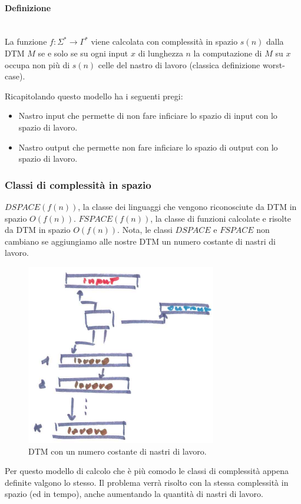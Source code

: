 \documentclass{article}
\begin{document}
\paragraph{Definizione}\mbox{}\\
La funzione $f:\Sigma^*\rightarrow\Gamma^*$ viene calcolata con complessità in spazio $s(n)$
dalla DTM $M$ se e solo se su ogni input $x$ di lunghezza $n$ la computazione di $M$ su $x$ occupa
non più di $s(n)$ celle del nastro di lavoro (classica definizione worst-case).

Ricapitolando questo modello ha i seguenti pregi:
\begin{itemize}
    \item Nastro input che permette di non fare inficiare lo spazio di input con lo spazio di lavoro.
    \item Nastro output che permette non fare inficiare lo spazio di output con lo spazio di lavoro.
\end{itemize}

\subsubsection{Classi di complessità in spazio}
$DSPACE(f(n))$, la classe dei linguaggi che vengono riconosciute da DTM in spazio $O(f(n))$.
$FSPACE(f(n))$, la classe di funzioni calcolate e risolte da DTM in spazio $O(f(n))$.
Nota, le classi $DSPACE$ e $FSPACE$ non cambiano se aggiungiamo alle nostre DTM un numero
costante di nastri di lavoro.
\begin{figure}[H]
    \centering
    \includegraphics[scale=0.5]{images/dtm_nastrilavoro.png}
    \caption{DTM con un numero costante di nastri di lavoro.}
\end{figure}
Per questo modello di calcolo che è più comodo le classi di complessità appena definite
valgono lo stesso. Il problema verrà risolto con la stessa complessità in spazio (ed
in tempo), anche aumentando la quantità di nastri di lavoro.
\end{document}
